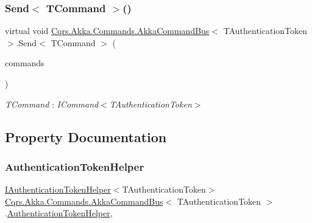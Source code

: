 \subsubsection{\texorpdfstring{Send$<$ T\+Command $>$()}{Send< TCommand >()}\hspace{0.1cm}{\footnotesize\ttfamily [2/2]}}
{\footnotesize\ttfamily virtual void \hyperlink{classCqrs_1_1Akka_1_1Commands_1_1AkkaCommandBus}{Cqrs.\+Akka.\+Commands.\+Akka\+Command\+Bus}$<$ T\+Authentication\+Token $>$.Send$<$ T\+Command $>$ (\begin{DoxyParamCaption}\item[{I\+Enumerable$<$ T\+Command $>$}]{commands }\end{DoxyParamCaption})\hspace{0.3cm}{\ttfamily [virtual]}}

\begin{Desc}
\item[Type Constraints]\begin{description}
\item[{\em T\+Command} : {\em I\+Command$<$T\+Authentication\+Token$>$}]\end{description}
\end{Desc}


\subsection{Property Documentation}
\mbox{\label{classCqrs_1_1Akka_1_1Commands_1_1AkkaCommandBus_ad74a628484d215ec6daab02b20ac1dbe_ad74a628484d215ec6daab02b20ac1dbe}} 
\subsubsection{\texorpdfstring{Authentication\+Token\+Helper}{AuthenticationTokenHelper}}
{\footnotesize\ttfamily \hyperlink{interfaceCqrs_1_1Authentication_1_1IAuthenticationTokenHelper}{I\+Authentication\+Token\+Helper}$<$T\+Authentication\+Token$>$ \hyperlink{classCqrs_1_1Akka_1_1Commands_1_1AkkaCommandBus}{Cqrs.\+Akka.\+Commands.\+Akka\+Command\+Bus}$<$ T\+Authentication\+Token $>$.\hyperlink{classCqrs_1_1Authentication_1_1AuthenticationTokenHelper}{Authentication\+Token\+Helper}\hspace{0.3cm}{\ttfamily [get]}, {\ttfamily [protected]}}

